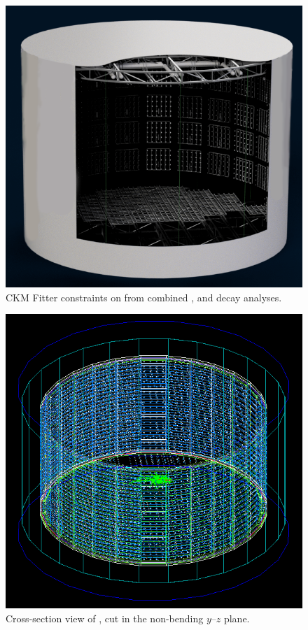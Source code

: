 \begin{figure}
    \includegraphics[width=\largefigwidth]{diagrams/chips_render_1}
    \caption[CKM Fitter constraints on \alphaCKM.]%
    {CKM Fitter constraints on \alphaCKM from combined \BToPiPi,
        \BToRhoPi and \BToRhoRho decay analyses.}
    \label{fig:chips_render_1}
\end{figure}

\begin{figure}
    \begin{center}
        \includegraphics[width=0.8\textheight]{diagrams/chips_event}
        \caption[Cross-section view of \LHCb, cut in the non-bending $y$--$z$ plane]%
        {Cross-section view of \LHCb, cut in the non-bending $y$--$z$ plane.}
        \label{fig:chips_event}
    \end{center}
\end{figure}


